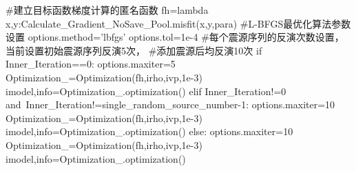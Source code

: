 \documentclass[12pt]{article}
\begin{document}
\begin{python}
    #建立目标函数梯度计算的匿名函数
    fh=lambda x,y:Calculate_Gradient_NoSave_Pool.misfit(x,y,para)    
    #L-BFGS最优化算法参数设置
    options.method='lbfgs'
    options.tol=1e-4
    #每个震源序列的反演次数设置，当前设置初始震源序列反演5次，
    #添加震源后均反演10次
    if Inner_Iteration==0:
        options.maxiter=5
        Optimization_=Optimization(fh,irho,ivp,1e-3)
        imodel,info=Optimization_.optimization()
    elif Inner_Iteration!=0 and\
         Inner_Iteration!=single_random_source_number-1:
        options.maxiter=10
        Optimization_=Optimization(fh,irho,ivp,1e-3)
        imodel,info=Optimization_.optimization()
    else:
        options.maxiter=10
        Optimization_=Optimization(fh,irho,ivp,1e-3)
        imodel,info=Optimization_.optimization()
\end{python}
\par
\end{document}
